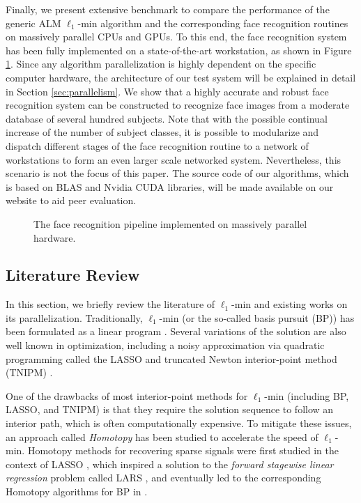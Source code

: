 \documentclass[10pt,twocolumn,letterpaper]{article}
\begin{document}
Finally, we present extensive benchmark to compare the performance of the
generic ALM $\ell_1$-min algorithm and the corresponding face recognition
routines on massively parallel CPUs and GPUs.  To this end, the face
recognition system has been fully implemented on a state-of-the-art
workstation, as shown in Figure \ref{fig:pipeline}. Since any algorithm
parallelization is highly dependent on the specific computer hardware, the
architecture of our test system will be explained in detail in Section
\ref{sec:parallelism}.  We show that a highly accurate and robust face
recognition system can be constructed to recognize face images from a moderate
database of several hundred subjects. Note that with the possible continual
increase of the number of subject classes, it is possible to modularize and
dispatch different stages of the face recognition routine to a network of
workstations to form an even larger scale networked system. Nevertheless, this
scenario is not the focus of this paper. The source code of our algorithms,
which is based on BLAS and Nvidia CUDA libraries, will be made available on our
website to aid peer evaluation.
\begin{figure}
\centering
{\tiny }
\caption{The face recognition pipeline implemented on massively parallel hardware.}
\label{fig:pipeline}
\end{figure}

\subsection{Literature Review} 
In this section, we briefly review the literature of $\ell_1$-min and existing
works on its parallelization.  Traditionally, $\ell_1$-min (or the so-called
basis pursuit (BP)) has been formulated as a linear program
\cite{ChenS2001-SIAM}. Several variations of the solution are also well known
in optimization, including a noisy approximation via quadratic programming
called the LASSO \cite{TibshiraniR1996} and truncated Newton interior-point
method (TNIPM) \cite{KimS2007}.

One of the drawbacks of most interior-point methods for $\ell_1$-min (including
BP, LASSO, and TNIPM) is that they require the solution sequence to follow an
interior path, which is often computationally expensive. To mitigate these
issues, an approach called \emph{Homotopy} has been studied to accelerate the
speed of $\ell_1$-min. Homotopy methods for recovering sparse signals were
first studied in the context of LASSO \cite{OsborneM2000}, which inspired a
solution to the \emph{forward stagewise linear regression} problem called LARS
\cite{EfronB2004}, and eventually led to the corresponding Homotopy algorithms
for BP in \cite{MalioutovD2005,DonohoD2006}.
\end{document}
